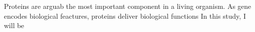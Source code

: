 Proteins are arguab the most important component in a living organism. As gene encodes biological feactures, proteins deliver biological functions   In this study, I will be 